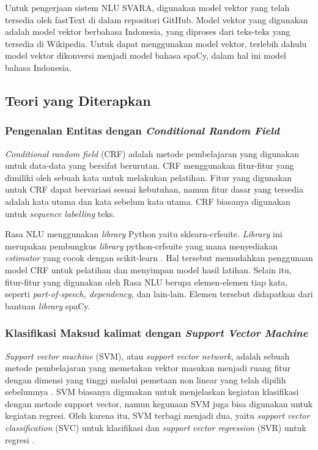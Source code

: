 Untuk pengerjaan sistem NLU SVARA, digunakan model vektor yang telah tersedia oleh fastText di dalam repositori GitHub. Model vektor yang digunakan adalah model vektor berbahasa Indonesia, yang diproses dari teks-teks yang tersedia di Wikipedia. Untuk dapat menggunakan model vektor, terlebih dahulu model vektor dikonversi menjadi model bahasa spaCy, dalam hal ini model bahasa Indonesia.

\subsection{Teori yang Diterapkan}

\subsubsection{Pengenalan Entitas dengan \textit{Conditional Random Field}}

\textit{Conditional random field} (CRF) adalah metode pembelajaran yang digunakan untuk data-data yang bersifat berurutan. CRF menggunakan fitur-fitur yang dimiliki oleh sebuah kata untuk melakukan pelatihan. Fitur yang digunakan untuk CRF dapat bervariasi sesuai kebutuhan, namun fitur dasar yang tersedia adalah kata utama dan kata sebelum kata utama. CRF biasanya digunakan untuk \textit{sequence labelling} teks.

Rasa NLU menggunakan \textit{library} Python yaitu sklearn-crfsuite. \textit{Library} ini merupakan pembungkus \textit{library} python-crfsuite yang mana menyediakan \textit{estimator} yang cocok dengan scikit-learn \parencite{sklearncrf}. Hal tersebut memudahkan penggunaan model CRF untuk pelatihan dan menyimpan model hasil latihan. Selain itu, fitur-fitur yang digunakan oleh Rasa NLU berupa elemen-elemen tiap kata, seperti \textit{part-of-speech, dependency,} dan lain-lain. Elemen tersebut didapatkan dari bantuan \textit{library} spaCy.

\subsubsection{Klasifikasi Maksud kalimat dengan \textit{Support Vector Machine}}

\textit{Support vector machine} (SVM), atau \textit{support vector network}, adalah sebuah metode pembelajaran yang memetakan vektor masukan menjadi ruang fitur dengan dimensi yang tinggi melalui pemetaan non linear yang telah dipilih sebelumnya \parencite{cortes1995support}. SVM biasanya digunakan untuk menjelaskan kegiatan klasifikasi dengan metode support vector, namun kegunaan SVM juga bisa digunakan untuk kegiatan regresi. Oleh karena itu, SVM terbagi menjadi dua, yaitu \textit{support vector classification} (SVC) untuk klasifikasi dan \textit{support vector regression} (SVR) untuk regresi \parencite{gunn1998support}.

